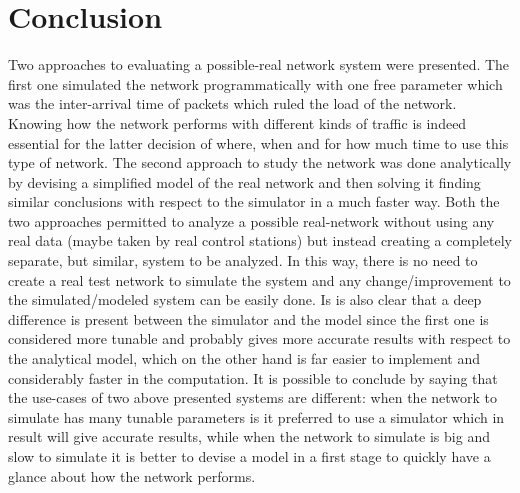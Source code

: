 \documentclass[conference]{IEEEtran}
\begin{document}
\section{Conclusion}\label{sec:conclusion}
Two approaches to evaluating a possible-real network system were presented. The first one simulated the network programmatically with one free parameter which was the inter-arrival time of packets which ruled the load of the network. Knowing how the network performs with different kinds of traffic is indeed essential for the latter decision of where, when and for how much time to use this type of network. The second approach to study the network was done analytically by devising a simplified model of the real network and then solving it finding similar conclusions with respect to the simulator in a much faster way. Both the two approaches permitted to analyze a possible real-network without using any real data (maybe taken by real control stations) but instead creating a completely separate, but similar, system to be analyzed. In this way, there is no need to create a real test network to simulate the system and any change/improvement to the simulated/modeled system can be easily done. Is is also clear that a deep difference is present between the simulator and the model since the first one is considered more tunable and probably gives more accurate results with respect to the analytical model, which on the other hand is far easier to implement and considerably faster in the computation. It is possible to conclude by saying that the use-cases of two above presented systems are different: when the network to simulate has many tunable parameters is it preferred to use a simulator which in result will give accurate results, while when the network to simulate is big  and slow to simulate it is better to devise a model in a first stage to quickly have a glance about how the network performs.
\end{document}
